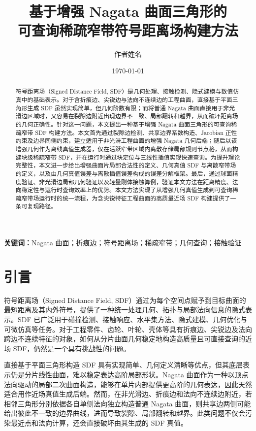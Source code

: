 \documentclass[11pt,a4paper]{ctexart}
\title{\bfseries 基于增强 Nagata 曲面三角形的\\可查询稀疏窄带符号距离场构建方法}
\author{作者姓名}
\date{\today}
\begin{document}
\maketitle

\begin{abstract}
符号距离场（Signed Distance Field, SDF）是几何处理、接触检测、隐式建模与数值仿真中的基础表示。对于含折痕边、尖锐边与法向不连续边的工程曲面，直接基于平面三角形生成 SDF 虽然实现简单，但几何阶数有限；而将普通 Nagata 曲面直接用于非光滑边区域时，又容易在裂隙边附近出现边界不一致、局部翻转和越界，从而破坏距离场的几何正确性。针对这一问题，本文提出一种基于增强 Nagata 曲面三角形的可查询稀疏窄带 SDF 构建方法。本文首先通过裂隙边检测、共享边界系数构造、Jacobian 正性约束及边界同侧约束，建立适用于非光滑工程曲面的增强 Nagata 几何后端；随后以该增强几何作为离线真值生成器，仅在活跃窄带区域内离散存储局部规则节点格，从而构建块级稀疏窄带 SDF，并在运行时通过块定位与三线性插值实现快速查询。为提升理论完整性，本文进一步给出增强曲面片局部合法性的定义、几何真值 SDF 与离散窄带场的定义，以及由几何真值误差与离散插值误差构成的误差分解框架。最后，通过球面精度验证、非光滑边局部几何验证以及轻量刚体接触算例，验证本文方法在距离精度、法向稳定性与运行时查询效率上的优势。本文方法实现了从增强几何真值生成到可查询稀疏窄带场运行时的统一流程，为含尖锐特征工程曲面的高质量近场 SDF 构建提供了一条可复现路径。
\end{abstract}

\noindent\textbf{关键词：}Nagata 曲面；折痕边；符号距离场；稀疏窄带；几何查询；接触验证

\section{引言}

符号距离场（Signed Distance Field, SDF）通过为每个空间点赋予到目标曲面的最短距离及其内外符号，提供了一种统一处理几何、拓扑与局部法向信息的隐式表示。SDF 已广泛用于碰撞检测、接触响应、水平集方法、隐式建模、几何优化与可微仿真等任务。对于工程零件、齿轮、叶轮、壳体等具有折痕边、尖锐边及法向跨边不连续特征的对象，如何从分片曲面几何稳定地构造高质量且可直接查询的近场 SDF，仍然是一个具有挑战性的问题。

直接基于平面三角形构造 SDF 具有实现简单、几何定义清晰等优点，但其底层表示仍是分片线性曲面，难以稳定表达高阶局部形状。Nagata 曲面作为一种以顶点法向驱动的局部二次曲面构造，能够在单片内部提供更高阶的几何表达，因此天然适合用作近场真值生成后端。然而，在非光滑边、折痕边和法向不连续边附近，若相邻三角形分别依据各自单侧法向独立构造普通 Nagata 曲面，则共享边两侧可能给出彼此不一致的边界曲线，进而导致裂隙、局部翻转和越界。此类问题不仅会污染最近点和法向计算，还会直接破坏由其生成的 SDF 真值。
\end{document}

